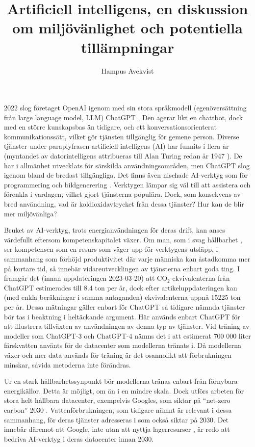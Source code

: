 \documentclass[12pt]{article}
\title{Artificiell intelligens, en diskussion om miljövänlighet och potentiella
tillämpningar}
\author{Hampus Avekvist}
\begin{document}
\maketitle

2022 slog företaget OpenAI igenom med sin stora språkmodell (egenöversättning
från large language model, LLM) ChatGPT \cite{chatGpt}. Den agerar likt en
chattbot, dock med en större kunskapsbas än tidigare, och ett
konversationsorienterat kommunikationssätt, vilket gör tjänsten tillgänglig
för gemene person. Diverse tjänster under paraplyfrasen artificiell intelligens
(AI) har funnits i flera år (myntandet av datorintelligens attribueras till
Alan Turing redan år 1947 \cite{historyOfAI}). De har i allmänhet utvecklats
för särskilda användningsområden, men ChatGPT slog igenom bland de bredast
tillgängliga. Det finns även nischade AI-verktyg som för programmering
\cite{copilot, tabnine} och bildgenerering \cite{dall-e, midjourney}. Verktygen
lämpar sig väl till att assistera och förenkla i vardagen, vilket gjort
tjänsterna populära. Dock, som konsekvens av bred användning, vad är
koldioxidavtrycket från dessa tjänster? Hur kan de blir mer miljövänliga?

Bruket av AI-verktyg, trots energianvändningen för deras drift, kan anses
värdefullt eftersom kompetenskapitalet växer. Om man, som i svag hållbarhet
\cite[15]{gullikssonHolmgren}, ser kompetensen som en resurs som väger upp
för verktygens utsläpp, i sammanhang som förhöjd produktivitet där varje
människa kan åstadkomma mer på kortare tid, så innebär vidareutvecklingen
av tjänsterna enbart goda ting. I \cite{carbonFootprintOfChatGpt} framgår
det (innan uppdateringen 2023-03-20) att CO$_2$-ekvivalenterna från ChatGPT
estimerades till 8.4 ton per år, dock efter artikeluppdateringen kan (med
enkla beräkningar i samma antaganden) ekvivalenterna uppnå 15225 ton per år.
Dessa mätningar gäller enbart för ChatGPT så tidigare nämnda tjänster bör
tas i beaktning i heltäckande argument. Här används enbart ChatGPT för att
illustrera tillväxten av användningen av denna typ av tjänster. Vid träning
av modeller som ChatGPT-3 och ChatGPT-4 nämns det i
\cite{environmentalImpactOfChatGpt} att estimerat 700 000 liter färskvatten
använts för de datacenter som modellerna tränats i. Då modellerna växer och
mer data används för träning är det osannolikt att förbrukningen minskar,
såvida metoderna inte förändras.

Ur en stark hållbarhetssynpunkt \cite{gullikssonHolmgren} bör modellerna
tränas enbart från förnybara energikällor. Detta är möjligt, om än i en
mindre skala. Dock utförs arbeten för stora helt hållbara datacenter, exempelvis
Googles, som siktar på ``net-zero carbon'' 2030 \cite{googleNetZeroCarbon}.
Vattenförbrukningen, som tidigare nämnt är relevant i dessa sammanhang, för
deras tjänster adresseras i \cite{googleWaterStewardship} som också siktar på
2030. Det innebär däremot att Google, inte utan att nyttja lagerresurser
\cite[16]{gullikssonHolmgren}, är redo att bedriva AI-verktyg i deras datacenter
innan 2030.
\end{document}

